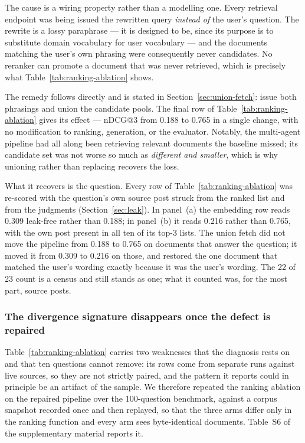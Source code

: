 \documentclass[acmsmall,review,anonymous,screen]{acmart}
\begin{document}
The cause is a wiring property rather than a modelling one. Every retrieval
endpoint was being issued the rewritten query \emph{instead of} the user's
question. The rewrite is a lossy paraphrase --- it is designed to be, since its
purpose is to substitute domain vocabulary for user vocabulary --- and the
documents matching the user's own phrasing were consequently never candidates.
No reranker can promote a document that was never retrieved, which is precisely
what Table~\ref{tab:ranking-ablation} shows.

The remedy follows directly and is stated in Section~\ref{sec:union-fetch}: issue
both phrasings and union the candidate pools. The final row of
Table~\ref{tab:ranking-ablation} gives its effect --- nDCG@3 from 0.188 to 0.765
in a single change, with no modification to ranking, generation, or the
evaluator. Notably, the multi-agent pipeline had all along been retrieving
relevant documents the baseline missed; its candidate set was not worse so much
as \emph{different and smaller}, which is why unioning rather than replacing
recovers the loss.

What it recovers is the question. Every row of Table~\ref{tab:ranking-ablation}
was re-scored with the question's own source post struck from the ranked list
and from the judgments (Section~\ref{sec:leak}). In panel~(a) the embedding row
reads 0.309 leak-free rather than 0.188; in panel~(b) it reads 0.216 rather than
0.765, with the own post present in all ten of its top-3 lists. The union fetch
did not move the pipeline from 0.188 to 0.765 on documents that answer the
question; it moved it from 0.309 to 0.216 on those, and restored the one
document that matched the user's wording exactly because it was the user's
wording. The 22 of 23 count is a census and still stands as one; what it counted
was, for the most part, source posts.

\subsubsection*{The divergence signature disappears once the defect is repaired}

Table~\ref{tab:ranking-ablation} carries two weaknesses that the diagnosis rests
on and that ten questions cannot remove: its rows come from separate runs against
live sources, so they are not strictly paired, and the pattern it reports could in
principle be an artifact of the sample. We therefore repeated the ranking
ablation on the repaired pipeline over the 100-question benchmark, against a
corpus snapshot recorded once and then replayed, so that the three arms differ
only in the ranking function and every arm sees byte-identical documents.
Table~S6 of the supplementary material reports it.
\end{document}
